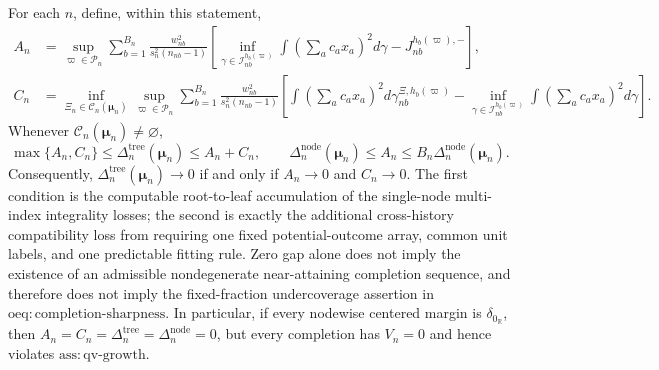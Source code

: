 For each \(n\), define, within this statement,
\[
 \begin{aligned}
 A_n&=\sup_{\varpi\in\mathcal P_n}\sum_{b=1}^{B_n}
 \frac{w_{nb}^2}{s_n^2(n_{nb}-1)}\left[
 \inf_{\gamma\in\mathcal I_{nb}^{h_b(\varpi)}}\int\left(\sum_ac_ax_a\right)^2d\gamma-J_{nb}^{h_b(\varpi),-}\right],\\
 C_n&=\inf_{\Xi_n\in\mathcal C_n(\boldsymbol\mu_n)}\sup_{\varpi\in\mathcal P_n}
 \sum_{b=1}^{B_n}\frac{w_{nb}^2}{s_n^2(n_{nb}-1)}\left[
 \int\left(\sum_ac_ax_a\right)^2d\gamma_{nb}^{\Xi,h_b(\varpi)}
 -\inf_{\gamma\in\mathcal I_{nb}^{h_b(\varpi)}}\int\left(\sum_ac_ax_a\right)^2d\gamma\right].
 \end{aligned}
\]
Whenever \(\mathcal C_n(\boldsymbol\mu_n)\ne\varnothing\),
\[
 \max\{A_n,C_n\}\le\Delta_n^{\mathrm{tree}}(\boldsymbol\mu_n)\le A_n+C_n,
 \qquad
 \Delta_n^{\mathrm{node}}(\boldsymbol\mu_n)\le A_n\le B_n\Delta_n^{\mathrm{node}}(\boldsymbol\mu_n).
\]
Consequently, \(\Delta_n^{\mathrm{tree}}(\boldsymbol\mu_n)\to0\) if and only if \(A_n\to0\) and \(C_n\to0\).  The first condition is the computable root-to-leaf accumulation of the single-node multi-index integrality losses; the second is exactly the additional cross-history compatibility loss from requiring one fixed potential-outcome array, common unit labels, and one predictable fitting rule.  Zero gap alone does not imply the existence of an admissible nondegenerate near-attaining completion sequence, and therefore does not imply the fixed-fraction undercoverage assertion in \(\mathrm{oeq:completion\text{-}sharpness}\).  In particular, if every nodewise centered margin is \(\delta_{0_{\mathbb R}}\), then \(A_n=C_n=\Delta_n^{\mathrm{tree}}=\Delta_n^{\mathrm{node}}=0\), but every completion has \(V_n=0\) and hence violates \(\mathrm{ass:qv\text{-}growth}\).